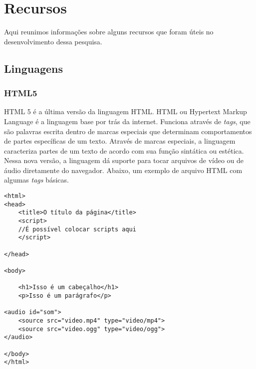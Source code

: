 {\chapter[Recursos]{Recursos}}
\label{ch:recursos}



 



%

Aqui reunimos informações sobre alguns recursos que foram úteis no desenvolvimento dessa pesquisa. 

\section{Linguagens}
\subsection{HTML5}
HTML 5 é a última versão da linguagem HTML. HTML ou Hypertext Markup Language é a linguagem base por trás da internet. Funciona através de \emph{tags}, que são palavras escrita dentro de marcas especiais que determinam comportamentos de partes específicas de um texto. Através de marcas especiais, a linguagem caracteriza partes de um texto de acordo com sua função sintática ou estética. Nessa nova versão, a linguagem dá suporte para tocar arquivos de vídeo ou de áudio diretamente do navegador. Abaixo, um exemplo de arquivo HTML com algumas \emph{tags} básicas.

\begin{verbatim}
<html>
<head>
    <title>O título da página</title>
    <script>
    //É possível colocar scripts aqui
    </script>

</head>

<body>

    <h1>Isso é um cabeçalho</h1>
    <p>Isso é um parágrafo</p>

<audio id="som">
    <source src="video.mp4" type="video/mp4">
    <source src="video.ogg" type="video/ogg">
</audio>

</body>
</html>
\end{verbatim}

